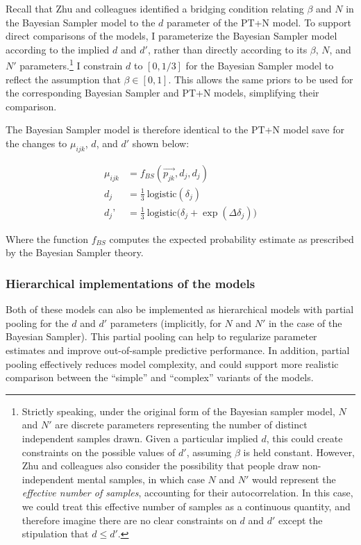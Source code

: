 \documentclass[
  english,
  man,floatsintext]{apa6}
\begin{document}
Recall that Zhu and colleagues \autocite*{zhu.etal2020} identified a bridging condition relating \(\beta\) and \(N\) in the Bayesian Sampler model to the \(d\) parameter of the PT+N model. To support direct comparisons of the models, I parameterize the Bayesian Sampler model according to the implied \(d\) and \(d'\), rather than directly according to its \(\beta\), \(N\), and \(N'\) parameters.\footnote{Strictly speaking, under the original form of the Bayesian sampler model, \(N\) and \(N'\) are discrete parameters representing the number of distinct independent samples drawn. Given a particular implied \(d\), this could create constraints on the possible values of \(d'\), assuming \(\beta\) is held constant. However, Zhu and colleagues \autocite*{zhu.etal2020} also consider the possibility that people draw non-independent mental samples, in which case \(N\) and \(N'\) would represent the \emph{effective number of samples}, accounting for their autocorrelation. In this case, we could treat this effective number of samples as a continuous quantity, and therefore imagine there are no clear constraints on \(d\) and \(d'\) except the stipulation that \(d \leq d'\).} I constrain \(d\) to \([0, 1/3]\) for the Bayesian Sampler model to reflect the assumption that \(\beta \in [0, 1]\). This allows the same priors to be used for the corresponding Bayesian Sampler and PT+N models, simplifying their comparison.

The Bayesian Sampler model is therefore identical to the PT+N model save for the changes to \(\mu_{ijk}\), \(d\), and \(d'\) shown below:

\begin{align*}
  \mu_{ijk} &= f_{BS}(\overrightarrow{p_{jk}}, d_j, d_j)  \\
  d_j &= \frac{1}{3} \ \text{logistic}(\delta_j) \\
  d_j’ &= \frac{1}{3} \ \text{logistic}\big(\delta_j + \exp(\Delta\delta_j)\big)
\end{align*}

Where the function \(f_{BS}\) computes the expected probability estimate as prescribed by the Bayesian Sampler theory.

\hypertarget{hierarchical-implementations-of-the-models}{%
\subsubsection{Hierarchical implementations of the models}\label{hierarchical-implementations-of-the-models}}

Both of these models can also be implemented as hierarchical models with partial pooling for the \(d\) and \(d'\) parameters (implicitly, for \(N\) and \(N'\) in the case of the Bayesian Sampler). This partial pooling can help to regularize parameter estimates and improve out-of-sample predictive performance. In addition, partial pooling effectively reduces model complexity, and could support more realistic comparison between the ``simple'' and ``complex'' variants of the models.
\end{document}
